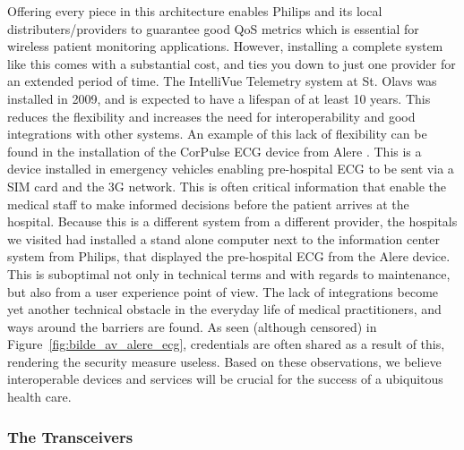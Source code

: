 Offering every piece in this architecture enables Philips and its local distributers/providers to guarantee good QoS metrics which is essential for wireless patient monitoring applications. However, installing a complete system like this comes with a substantial cost, and ties you down to just one provider for an extended period of time. The IntelliVue Telemetry system at St. Olavs was installed in 2009, and is expected to have a lifespan of at least 10 years. This reduces the flexibility and increases the need for interoperability and good integrations with other systems. An example of this lack of flexibility can be found in the installation of the CorPulse ECG device from Alere \cite{alere}. This is a device installed in emergency vehicles enabling pre-hospital ECG to be sent via a SIM card and the 3G network. This is often critical information that enable the medical staff to make informed decisions before the patient arrives at the hospital. Because this is a different system from a different provider, the hospitals we visited had installed a stand alone computer next to the information center system from Philips, that displayed the pre-hospital ECG from the Alere device. This is suboptimal not only in technical terms and with regards to maintenance, but also from a user experience point of view. The lack of integrations become yet another technical obstacle in the everyday life of medical practitioners, and ways around the barriers are found. As seen (although censored) in Figure~\ref{fig:bilde_av_alere_ecg}, credentials are often shared as a result of this, rendering the security measure useless. Based on these observations, we believe interoperable devices and services will be crucial for the success of a ubiquitous health care.


\subsubsection{The Transceivers} %
\label{ssub:the_transceivers}

